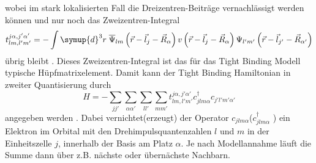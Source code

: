 wobei im stark lokalisierten Fall die Dreizentren-Beiträge vernachlässigt werden können und  
nur noch das Zweizentren-Integral 
\begin{equation*} 
    t^{j\alpha,j'\alpha'}_{lm,l'm'} = - \int \symup{d}^3r \; \overline{\Psi}_{lm} \left (\vec{r}-\vec{l}_j - \vec{R}_{\alpha} \right ) 
    v \left ( \vec{r} - \vec{l}_{j} - \vec{R}_{\alpha} \right ) \Psi_{l'm'} \left (\vec{r}-\vec{l}_{j'} - \vec{R}_{\alpha'} \right ) 
\end{equation*}
übrig bleibt \cite{SC_literature}.
Dieses Zweizentren-Integral ist das für das Tight Binding Modell typische Hüpfmatrixelement.
Damit kann der Tight Binding Hamiltonian in zweiter Quantisierung durch
\begin{equation}
    H = - \sum_{jj'} \sum_{\alpha \alpha'}\sum_{ll'} \sum_{mm'} t^{j\alpha,j'\alpha'}_{lm,l'm'}  c_{jlm\alpha}^\dagger c_{j'l'm'\alpha'}  \label{eqn:tight-binding-hamiltonian}
\end{equation}
angegeben werden \cite{anders-fkt}.
Dabei vernichtet(erzeugt) der Operator $c_{jlm\alpha}$($c_{jlm\alpha}^{\dagger}$ ) ein Elektron im Orbital mit den Drehimpulsquantenzahlen $l$ und $m$ in der Einheitszelle $j$,
innerhalb der Basis am Platz $\alpha$.
Je nach Modellannahme läuft die Summe dann über z.B. nächste oder übernächste Nachbarn.
